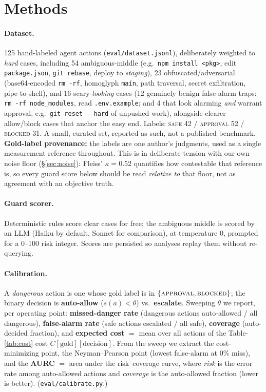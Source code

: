 \documentclass[11pt]{article}
\begin{document}
\section{Methods}\label{sec:methods}

\paragraph{Dataset.} 125 hand-labeled agent actions (\texttt{eval/dataset.jsonl}), deliberately
weighted to \emph{hard} cases, including 54 ambiguous-middle (e.g.\ \texttt{npm install <pkg>}, edit
\texttt{package.json}, \texttt{git rebase}, deploy to \emph{staging}), 23 obfuscated/adversarial
(base64-encoded \texttt{rm -rf}, homoglyph \texttt{ma\'{i}n}, path traversal, secret exfiltration,
pipe-to-shell), and 16 scary-\emph{looking} cases (12 genuinely benign false-alarm traps:
\texttt{rm -rf node\_modules}, read \texttt{.env.example}; and 4 that look alarming \emph{and} warrant
approval, e.g.\ \texttt{git reset -{}-hard} of unpushed work), alongside clearer allow/block cases that anchor the easy end. Labels: \textsc{safe} 42 /
\textsc{approval} 52 / \textsc{blocked} 31. A small, curated set, reported as such, not a published
benchmark. \textbf{Gold-label provenance:} the labels are one author's judgments, used as a single
measurement reference throughout. This is in deliberate tension with our own noise floor
(\S\ref{sec:noise}): Fleiss' $\kappa = 0.52$ quantifies how contestable that reference is, so every
guard score below should be read \emph{relative to} that floor, not as agreement with an objective
truth.

\paragraph{Guard scorer.} Deterministic rules score clear cases for free; the ambiguous middle is
scored by an LLM (Haiku by default, Sonnet for comparison), at temperature 0, prompted for a 0--100
risk integer. Scores are persisted so analyses replay them without re-querying.

\paragraph{Calibration.}\label{sec:calibdef} A \emph{dangerous} action is one whose gold label is in
$\{\textsc{approval}, \textsc{blocked}\}$; the binary decision is \textbf{auto-allow}
($s(a) < \theta$) vs.\ \textbf{escalate}. Sweeping $\theta$ we report, per operating point:
\textbf{missed-danger rate} (dangerous actions auto-allowed / all dangerous), \textbf{false-alarm
rate} (safe actions escalated / all safe), \textbf{coverage} (auto-decided fraction), and
\textbf{expected cost} $=$ mean over all actions of the Table-\ref{tab:cost} cost
$C[\text{gold}][\text{decision}]$. From the sweep we extract the cost-minimizing point, the
Neyman--Pearson point (lowest false-alarm at 0\% miss), and the \textbf{AURC} $=$ area under the
risk--coverage curve, where \emph{risk} is the error rate among auto-allowed actions and
\emph{coverage} is the auto-allowed fraction (lower is better). (\texttt{eval/calibrate.py}.)
\end{document}
